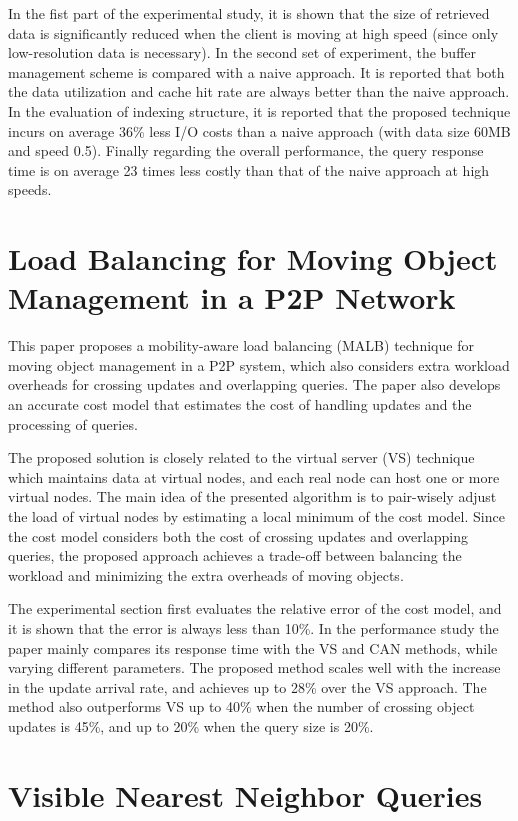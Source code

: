 \documentclass[paper=a4, fontsize=18pt]{article} %
\numberwithin{equation}{section} %
\numberwithin{figure}{section} %
\numberwithin{table}{section} %
\begin{document}
In the fist part of the experimental study, it is shown that the size of retrieved data is significantly reduced when the client is moving at high speed (since only low-resolution data is necessary). In the second set of experiment, the buffer management scheme is compared with a naive approach. It is reported that both the data utilization and cache hit rate are always better than the naive approach. In the evaluation of indexing structure, it is reported that the proposed technique incurs on average 36\% less I/O costs than a naive approach (with data size 60MB and speed 0.5). Finally regarding the overall performance, the query response time is on average 23 times less costly than that of the naive approach at high speeds.

\section{Load Balancing for Moving Object Management in a P2P Network \cite{ATZK08}}

This paper proposes a mobility-aware load balancing (MALB) technique for moving object management in a P2P system, which also considers extra workload overheads for crossing updates and overlapping queries. The paper also develops an accurate cost model that estimates the cost of handling updates and the processing of queries.

The proposed solution is closely related to the virtual server (VS) technique which maintains data at virtual nodes, and each real node can host one or more virtual nodes. The main idea of the presented algorithm is to pair-wisely adjust the load of virtual nodes by estimating a local minimum of the cost model. Since the cost model considers both the cost of crossing updates and overlapping queries, the proposed approach achieves a trade-off between balancing the workload and minimizing the extra overheads of moving objects.

The experimental section first evaluates the relative error of the cost model, and it is shown that the error is always less than 10\%. In the performance study the paper mainly compares its response time with the VS and CAN methods, while varying different parameters. The proposed method scales well with the increase in the update arrival rate, and achieves up to 28\% over the VS approach. The method also outperforms VS up to 40\% when the number of crossing object updates is 45\%, and up to 20\% when the query size is 20\%.

\section{Visible Nearest Neighbor Queries \cite{NTZ07}}
\end{document}
